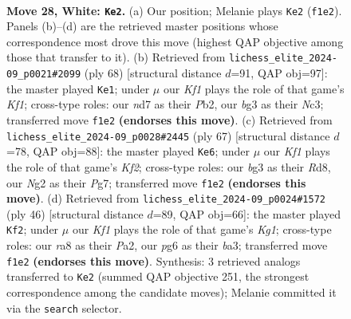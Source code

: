 \documentclass[11pt]{article}
\begin{document}
\clearpage

\begin{figure}[p]\centering
\begin{subfigure}{0.46\textwidth}\centering
\resizebox{\linewidth}{!}{%
\newchessgame
\chessboard[
  setfen={r6r/3nk2p/1pp1p1p1/8/1p1P3P/P3PRb1/RP4N1/2BQ1K1q w - - 7 28},
  showmover=false,
  pgfstyle=straightmove, color=movearrow, markmove={f1-e2}
]}
\caption{}
\end{subfigure}\hfill
\begin{subfigure}{0.46\textwidth}\centering
\resizebox{\linewidth}{!}{%
\newchessgame
\chessboard[
  setfen={1r2r1k1/p5pp/2p2p2/5P2/2pPP3/2N1Rb1q/PP3R2/2Q2K2 w - - 0 35},
  showmover=false,
  pgfstyle=straightmove, color=movearrow, markmove={f1-e1}
]}
\caption{}
\end{subfigure}
\\[4pt]
\begin{subfigure}{0.46\textwidth}\centering
\resizebox{\linewidth}{!}{%
\newchessgame
\chessboard[
  setfen={3r4/2q2kpQ/1p3r1p/p1b1p2B/5P1P/4p1PK/PP6/5R1R b - - 3 34},
  showmover=false,
  pgfstyle=straightmove, color=movearrow, markmove={f7-e6}
]}
\caption{}
\end{subfigure}\hfill
\begin{subfigure}{0.46\textwidth}\centering
\resizebox{\linewidth}{!}{%
\newchessgame
\chessboard[
  setfen={1k1r3r/ppp3p1/8/3P1p2/3pPP2/bP1Q1RP1/P1R3N1/6Kq w - - 2 24},
  showmover=false,
  pgfstyle=straightmove, color=movearrow, markmove={g1-f2}
]}
\caption{}
\end{subfigure}
\caption{\textbf{Move 28, White: \texttt{Ke2}.} (a) Our position; Melanie plays \texttt{Ke2} (\texttt{f1e2}). Panels (b)--(d) are the retrieved master positions whose correspondence most drove this move (highest QAP objective among those that transfer to it). (b) Retrieved from \texttt{lichess\_elite\_2024-09\_p0021\#2099} (ply 68) [structural distance $d$=91, QAP obj=97]: the master played \texttt{Ke1}; under $\mu$ our \emph{Kf1} plays the role of that game's \emph{Kf1}; cross-type roles: our \emph{n}d7 as their \emph{P}b2, our \emph{b}g3 as their \emph{N}c3; transferred move \texttt{f1e2} \textbf{(endorses this move)}. (c) Retrieved from \texttt{lichess\_elite\_2024-09\_p0028\#2445} (ply 67) [structural distance $d$=78, QAP obj=88]: the master played \texttt{Ke6}; under $\mu$ our \emph{Kf1} plays the role of that game's \emph{Kf2}; cross-type roles: our \emph{b}g3 as their \emph{R}d8, our \emph{N}g2 as their \emph{P}g7; transferred move \texttt{f1e2} \textbf{(endorses this move)}. (d) Retrieved from \texttt{lichess\_elite\_2024-09\_p0024\#1572} (ply 46) [structural distance $d$=89, QAP obj=66]: the master played \texttt{Kf2}; under $\mu$ our \emph{Kf1} plays the role of that game's \emph{Kg1}; cross-type roles: our \emph{r}a8 as their \emph{P}a2, our \emph{p}g6 as their \emph{b}a3; transferred move \texttt{f1e2} \textbf{(endorses this move)}. Synthesis: 3 retrieved analogs transferred to \texttt{Ke2} (summed QAP objective 251, the strongest correspondence among the candidate moves); Melanie committed it via the \texttt{search} selector.}
\label{fig:thought-m54}
\end{figure}
\end{document}
